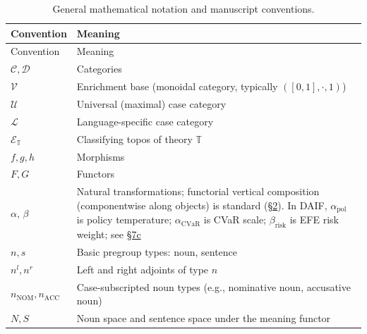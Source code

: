 \documentclass[
]{article}
\begin{document}
\begin{longtable}[]{@{}
  >{\raggedright\arraybackslash}p{}
  >{\raggedright\arraybackslash}p{}@{}}
\caption{General mathematical notation and manuscript
conventions.}\label{tbl:not-conventions}\tabularnewline
\toprule\noalign{}
\begin{minipage}[b]{\linewidth}\raggedright
Convention
\end{minipage} & \begin{minipage}[b]{\linewidth}\raggedright
Meaning
\end{minipage} \\
\midrule\noalign{}
\endfirsthead
\toprule\noalign{}
\begin{minipage}[b]{\linewidth}\raggedright
Convention
\end{minipage} & \begin{minipage}[b]{\linewidth}\raggedright
Meaning
\end{minipage} \\
\midrule\noalign{}
\endhead
\bottomrule\noalign{}
\endlastfoot
\(\mathcal{C}, \mathcal{D}\) & Categories \\
\(\mathcal{V}\) & Enrichment base (monoidal category, typically
\(([0,1], \cdot, 1)\)) \\
\(\mathcal{U}\) & Universal (maximal) case category \\
\(\mathcal{L}\) & Language-specific case category \\
\(\mathcal{E}_{\mathbb{T}}\) & Classifying topos of theory
\(\mathbb{T}\) \\
\(f, g, h\) & Morphisms \\
\(F, G\) & Functors \\
\(\alpha{}\), \(\beta{}\) & Natural transformations; functorial vertical
composition (componentwise along objects) is standard
(\href{02_case_systems.md\#sec:case-systems}{§2}). In DAIF,
\(\alpha_{\mathrm{pol}}\) is policy temperature;
\(\alpha_{\mathrm{CVaR}}\) is CVaR scale; \(\beta_{\mathrm{risk}}\) is
EFE risk weight; see
\href{07c_daif_results.md\#sec:daif-results}{§7c} \\
\(n, s\) & Basic pregroup types: noun, sentence \\
\(n^l, n^r\) & Left and right adjoints of type \(n\) \\
\(n_{\text{NOM}}, n_{\text{ACC}}\) & Case-subscripted noun types (e.g.,
nominative noun, accusative noun) \\
\(N, S\) & Noun space and sentence space under the meaning functor \\

\end{longtable}
\end{document}
